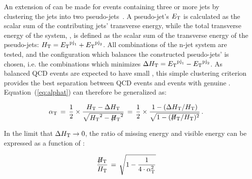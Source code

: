 An extension of \alphat can be made for events containing three or more jets
by clustering the jets into two pseudo-jets~\cite{cms-pas-sus-09001}. 
A pseudo-jet's ${E_{\text T}}$ is calculated as the scalar sum of the contributing 
jets' transverse energy, while the total transverse energy of the system, \scalht, 
is defined as the scalar sum of the transverse energy of the pseudo-jets: 
$\mbox{$H_\text{T}$} = {E_{\text T}}^{{\rm pj}_1}+{E_{\text T}}^{{\rm pj}_2}$.
All combinations of the n-jet system are tested, and the configuration which
balances the constructed pseudo-jets' \Et is chosen, i.e. the combinations which
minimizes $\Delta\mbox{$H_\text{T}$} = {E_{\text T}}^{{\rm pj}_1}-{E_{\text T}}^{{\rm pj}_2}$. As balanced QCD events
are expected to have small \dht, this simple clustering criterion provides the best
separation between QCD events and events with genuine \met. 
Equation~(\ref{eq:alphat}) can therefore be generalized as:

\begin{equation}
  \label{eq:alphat2}
  \alpha_{\text{T}}\, = \,\frac{1}{2} \times \frac{\mbox{$H_\text{T}$} -
    \Delta\mbox{$H_\text{T}$}}{\sqrt{\mbox{$H_\text{T}$}^2 - \mbox{$\not\!\!H_\text{T}$}^2}} \, = \,\frac{1}{2} \times 
  \frac{1 - (\Delta\mbox{$H_\text{T}$}/\mbox{$H_\text{T}$})}{\sqrt{1 - (\mbox{$\not\!\!H_\text{T}$}/\mbox{$H_\text{T}$})^2}} \, . 
\end{equation}

In the limit that  $\Delta\mbox{$H_\text{T}$} \rightarrow 0$, the ratio of missing energy and
visible energy can be expressed as a function of \alphat:

\begin{equation}
  \label{eq:alphat3}
  \frac{\mbox{$\not\!\!H_\text{T}$}}{\mbox{$H_\text{T}$}} \, = \, \sqrt{ 1 - \frac{1}{4 \cdot \alpha_{\text{T}}^2} }
\end{equation}

